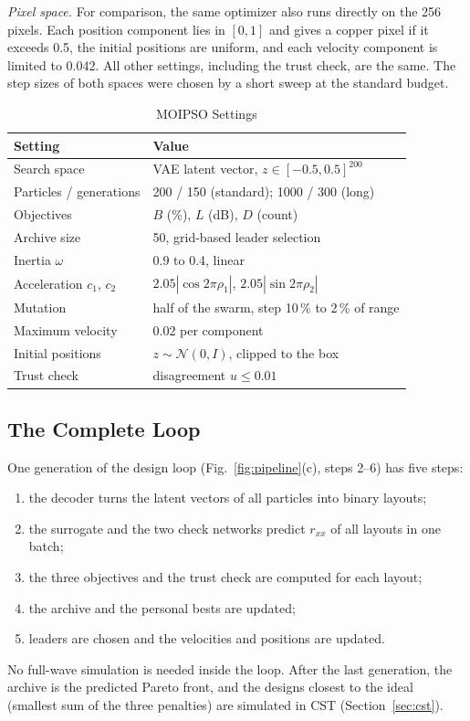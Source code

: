 \emph{Pixel space.} For comparison, the same optimizer also runs directly on the 256 pixels. Each position component lies in $[0,1]$ and gives a copper pixel if it exceeds 0.5, the initial positions are uniform, and each velocity component is limited to 0.042. All other settings, including the trust check, are the same. The step sizes of both spaces were chosen by a short sweep at the standard budget.

\begin{table}[!t]
\caption{MOIPSO Settings}
\label{tab:moipso}
\centering
\footnotesize
\begin{tabular}{@{}ll@{}}
\toprule
Setting & Value \\
\midrule
Search space & VAE latent vector, $z\in[-0.5,0.5]^{200}$ \\
Particles / generations & 200 / 150 (standard); 1000 / 300 (long) \\
Objectives & $B$ (\%), $L$ (dB), $D$ (count) \\
Archive size & 50, grid-based leader selection \\
Inertia $\omega$ & 0.9 to 0.4, linear \\
Acceleration $c_1$, $c_2$ & $2.05|\cos2\pi\rho_1|$, $2.05|\sin2\pi\rho_2|$ \\
Mutation & half of the swarm, step 10\,\% to 2\,\% of range \\
Maximum velocity & 0.02 per component \\
Initial positions & $z\sim\mathcal{N}(0,I)$, clipped to the box \\
Trust check & disagreement $u\leq0.01$ \\
\bottomrule
\end{tabular}
\end{table}

\subsection{The Complete Loop}
One generation of the design loop (Fig.~\ref{fig:pipeline}(c), steps 2--6) has five steps:
\begin{enumerate}
\item the decoder turns the latent vectors of all particles into binary layouts;
\item the surrogate and the two check networks predict $r_{xx}$ of all layouts in one batch;
\item the three objectives and the trust check are computed for each layout;
\item the archive and the personal bests are updated;
\item leaders are chosen and the velocities and positions are updated.
\end{enumerate}
No full-wave simulation is needed inside the loop. After the last generation, the archive is the predicted Pareto front, and the designs closest to the ideal (smallest sum of the three penalties) are simulated in CST (Section~\ref{sec:cst}).

